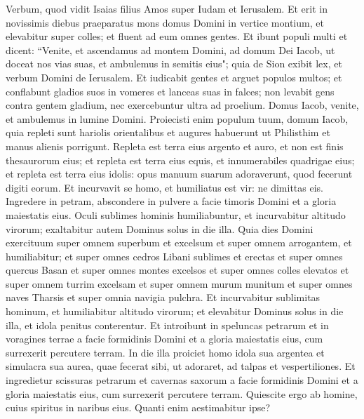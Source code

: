 \begin{biblechapter}  
\verse Verbum, quod vidit Isaias filius Amos super Iudam et Ierusalem. 
\verse Et erit in novissimis diebus praeparatus mons domus Domini in vertice montium, et elevabitur super colles; et fluent ad eum omnes gentes. 
\verse Et ibunt populi multi et dicent: “Venite, et ascendamus ad montem Domini, ad domum Dei Iacob, ut doceat nos vias suas, et ambulemus in semitis eius"; quia de Sion exibit lex, et verbum Domini de Ierusalem. 
\verse Et iudicabit gentes et arguet populos multos; et conflabunt gladios suos in vomeres et lanceas suas in falces; non levabit gens contra gentem gladium, nec exercebuntur ultra ad proelium. 
\verse Domus Iacob, venite, et ambulemus in lumine Domini. 
\verse Proiecisti enim populum tuum, domum Iacob, quia repleti sunt hariolis orientalibus et augures habuerunt ut Philisthim et manus alienis porrigunt. 
\verse Repleta est terra eius argento et auro, et non est finis thesaurorum eius; 
\verse et repleta est terra eius equis, et innumerabiles quadrigae eius; et repleta est terra eius idolis: opus manuum suarum adoraverunt, quod fecerunt digiti eorum. 
\verse Et incurvavit se homo, et humiliatus est vir: ne dimittas eis. 
\verse Ingredere in petram, abscondere in pulvere a facie timoris Domini et a gloria maiestatis eius. 
\verse Oculi sublimes hominis humiliabuntur, et incurvabitur altitudo virorum; exaltabitur autem Dominus solus in die illa. 
\verse Quia dies Domini exercituum super omnem superbum et excelsum et super omnem arrogantem, et humiliabitur; 
\verse et super omnes cedros Libani sublimes et erectas et super omnes quercus Basan 
\verse et super omnes montes excelsos et super omnes colles elevatos 
\verse et super omnem turrim excelsam et super omnem murum munitum 
\verse et super omnes naves Tharsis et super omnia navigia pulchra. 
\verse Et incurvabitur sublimitas hominum, et humiliabitur altitudo virorum; et elevabitur Dominus solus in die illa, 
\verse et idola penitus conterentur. 
\verse Et introibunt in speluncas petrarum et in voragines terrae a facie formidinis Domini et a gloria maiestatis eius, cum surrexerit percutere terram. 
\verse In die illa proiciet homo idola sua argentea et simulacra sua aurea, quae fecerat sibi, ut adoraret, ad talpas et vespertiliones. 
\verse Et ingredietur scissuras petrarum et cavernas saxorum a facie formidinis Domini et a gloria maiestatis eius, cum surrexerit percutere terram. 
\verse Quiescite ergo ab homine, cuius spiritus in naribus eius. Quanti enim aestimabitur ipse? 
\end{biblechapter}

